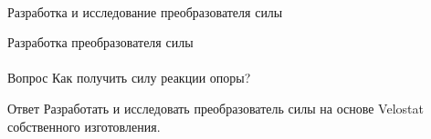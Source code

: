 \documentclass[aspectratio=169,xcolor=table,10pt]{beamer}
\begin{document}
\begin{frame}[c]{}
    \framesubtitle{}
    \centering\LARGE Разработка и исследование преобразователя силы
\end{frame}

\begin{frame}[t]{Разработка преобразователя силы}
    \framesubtitle{}
    {\large\begin{block}{Вопрос}
            Как получить силу реакции опоры?
        \end{block}}
    {\large\begin{alertblock}{Ответ}
            Разработать и исследовать преобразователь силы на основе Velostat собственного изготовления.
        \end{alertblock}}
\end{frame}
\end{document}
